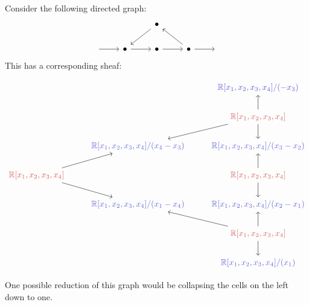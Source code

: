 \documentclass[12pt]{article}
\theoremstyle{definition}
\newcommand{\<}{\langle}
\renewcommand{\>}{\rangle}
\begin{document}
Consider the following directed graph:
\[\begin{tikzcd}
	&& \bullet \\
	{} & \bullet & \bullet & \bullet & {}
	\arrow[from=1-3, to=2-2]
	\arrow[from=2-1, to=2-2]
	\arrow[from=2-2, to=2-3]
	\arrow[from=2-3, to=2-4]
	\arrow[from=2-4, to=1-3]
	\arrow[from=2-4, to=2-5]
\end{tikzcd}\]
This has a corresponding sheaf:

\newpage
\[\begin{tikzcd}
	&& \textcolor{rgb,255:red,92;green,92;blue,214}{\mathbb{R}[x_1,x_2,x_3,x_4] / (-x_3)} \\
	&& \textcolor{rgb,255:red,214;green,92;blue,92}{\mathbb{R}[x_1,x_2,x_3,x_4]} \\
	& \textcolor{rgb,255:red,92;green,92;blue,214}{\mathbb{R}[x_1,x_2,x_3,x_4] / (x_4 -x_3)} & \textcolor{rgb,255:red,92;green,92;blue,214}{\mathbb{R}[x_1,x_2,x_3,x_4]/(x_3-x_2)} \\
	\textcolor{rgb,255:red,214;green,92;blue,92}{\mathbb{R}[x_1,x_2,x_3,x_4]} && \textcolor{rgb,255:red,214;green,92;blue,92}{\mathbb{R}[x_1,x_2,x_3,x_4]} \\
	& \textcolor{rgb,255:red,92;green,92;blue,214}{\mathbb{R}[x_1,x_2,x_3,x_4] /(x_1 - x_4)} & \textcolor{rgb,255:red,92;green,92;blue,214}{\mathbb{R}[x_1,x_2,x_3,x_4] / (x_2 - x_1)} \\
	&& \textcolor{rgb,255:red,214;green,92;blue,92}{\mathbb{R}[x_1,x_2,x_3,x_4]} \\
	&& \textcolor{rgb,255:red,92;green,92;blue,214}{\mathbb{R}[x_1,x_2,x_3,x_4] / (x_1)}
	\arrow[from=2-3, to=1-3]
	\arrow[from=2-3, to=3-2]
	\arrow[from=2-3, to=3-3]
	\arrow[from=4-1, to=3-2]
	\arrow[from=4-1, to=5-2]
	\arrow[from=4-3, to=3-3]
	\arrow[from=4-3, to=5-3]
	\arrow[from=6-3, to=5-2]
	\arrow[from=6-3, to=5-3]
	\arrow[from=6-3, to=7-3]
\end{tikzcd}\]

One possible reduction of this graph would be collapsing the cells on the left down to one. 
\end{document}

